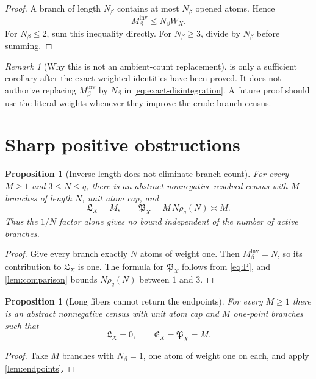 \documentclass[11pt]{article}
\newtheorem{proposition}[theorem]{Proposition}
\theoremstyle{definition}
\theoremstyle{remark}
\newtheorem{remark}[theorem]{Remark}
\newcommand{\PX}{\mathfrak P_X}
\newcommand{\EX}{\mathfrak E_X}
\newcommand{\LX}{\mathfrak L_X}
\begin{document}
\begin{proof}
A branch of length \(N_\beta\) contains at most \(N_\beta\) opened
atoms.  Hence
\[
 M_\beta^{\mathrm{inv}}\le N_\beta W_X.
\]
For \(N_\beta\le2\), sum this inequality directly.  For
\(N_\beta\ge3\), divide by \(N_\beta\) before summing.
\end{proof}

\begin{remark}[Why this is not an ambient-count replacement]
 is only a sufficient corollary after the exact
weighted identities have been proved.  It does not authorize
replacing \(M_\beta^{\mathrm{inv}}\) by \(N_\beta\) in
\eqref{eq:exact-disintegration}.  A future proof should use the
literal weights whenever they improve the crude branch census.
\end{remark}

\section{Sharp positive obstructions}
\label{sec:obstructions}

\begin{proposition}[Inverse length does not eliminate branch count]
\label{prop:branch-count}
For every \(M\ge1\) and \(3\le N\le q\), there is an abstract
nonnegative resolved census with \(M\) branches of length \(N\),
unit atom cap, and
\[
 \LX=M,\qquad
 \PX=M\,N\rho_q(N)\asymp M.
\]
Thus the \(1/N\) factor alone gives no bound independent of the
number of active branches.
\end{proposition}

\begin{proof}
Give every branch exactly \(N\) atoms of weight one.  Then
\(M_\beta^{\mathrm{inv}}=N\), so its contribution to \(\LX\) is
one.  The formula for \(\PX\) follows from
\eqref{eq:P}, and \cref{lem:comparison} bounds
\(N\rho_q(N)\) between \(1\) and \(3\).
\end{proof}

\begin{proposition}[Long fibers cannot return the endpoints]
\label{prop:endpoint-obstruction}
For every \(M\ge1\) there is an abstract nonnegative census with
unit atom cap and \(M\) one-point branches such that
\[
 \LX=0,\qquad\EX=\PX=M.
\]
\end{proposition}

\begin{proof}
Take \(M\) branches with \(N_\beta=1\), one atom of weight one on
each, and apply \cref{lem:endpoints}.
\end{proof}
\end{document}
